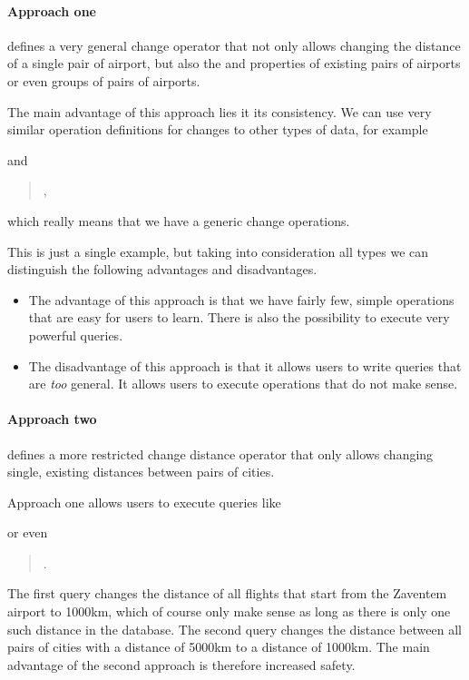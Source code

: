 \paragraph{Approach one}
defines a very general change operator that not only allows
changing the distance of a single pair of airport, but also the  and
 properties of existing pairs of airports or even groups of pairs of
airports.

The main advantage of this approach lies it its consistency.  We can use very
similar operation definitions for changes to other types of data, for example
\begin{quote}
\end{quote}
and
\begin{quote}
  ,
\end{quote}
which really means that we have a generic change operations.

This is just a single example, but taking into consideration all types we can
distinguish the following advantages and disadvantages.
\begin{itemize}
  \item The advantage of this approach is that we have fairly few, simple
    operations that are easy for users to learn. There is also the possibility
    to execute very powerful queries.
  \item The disadvantage of this approach is that it allows users to write
    queries that are \emph{too} general. It allows users to execute
    operations that do not make sense.
\end{itemize}

\paragraph{Approach two}
defines a more restricted change distance operator that only allows changing
single, existing distances between pairs of cities.

Approach one allows users to execute queries like
\begin{quote}
\end{quote}
or even
\begin{quote}
  .
\end{quote}
The first query changes the distance of all flights that start from the Zaventem
airport to 1000km, which of course only make sense as long as there is only one
such distance in the database. The second query changes the distance between all
pairs of cities with a distance of 5000km to a distance of 1000km. The main
advantage of the second approach is therefore increased safety.

